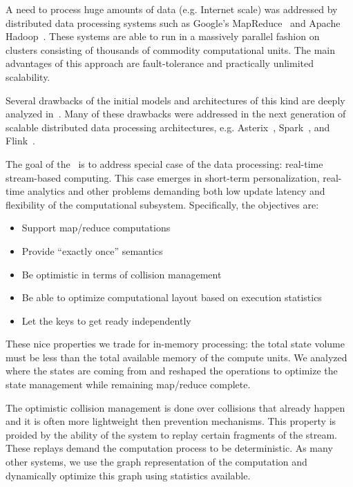 
\label {fs-intro-seciton}

A need to process huge amounts of data (e.g. Internet scale) was addressed by distributed data processing systems such as Google's MapReduce~\cite{Dean:2008:MSD:1327452.1327492} and Apache Hadoop~\cite{hadoop2009hadoop}. These systems are able to run in a massively parallel fashion on clusters consisting of thousands of commodity computational units. The main advantages of this approach are fault-tolerance and practically unlimited scalability.

Several drawbacks of the initial models and architectures of this kind are deeply analyzed in~\cite{Doulkeridis:2014:SLA:2628707.2628782}. Many of these drawbacks were addressed in the next generation of scalable distributed data processing architectures, e.g. Asterix~\cite{Alsubaiee:2012:ASW:2331801.2331803}, Spark~\cite{Zaharia:2016:ASU:3013530.2934664}, 
and Flink~\cite{carbone2015apache}. 

The goal of the \FlameStream\ is to address special case of the data processing: real-time stream-based computing. This case emerges in short-term personalization, real-time analytics and other problems demanding both low update latency and flexibility of the computational subsystem. Specifically, the objectives are:

\begin {itemize}
\item Support map/reduce computations
\item Provide ``exactly once'' semantics
\item Be optimistic in terms of collision management
\item Be able to optimize computational layout based on execution statistics
\item Let the keys to get ready independently
\end {itemize}

These nice properties we trade for in-memory processing: the total state volume must be less than the total available memory of the compute units. We analyzed where the states are coming from and reshaped the operations to optimize the state management while remaining map/reduce complete. 

The optimistic collision management is done over collisions that already happen and it is often more lightweight then prevention mechanisms. This property is proided by the ability of the system to replay certain fragments of the stream. These replays demand the computation process to be deterministic. As many other systems, we use the graph representation of the computation and dynamically optimize this graph using statistics available. 


